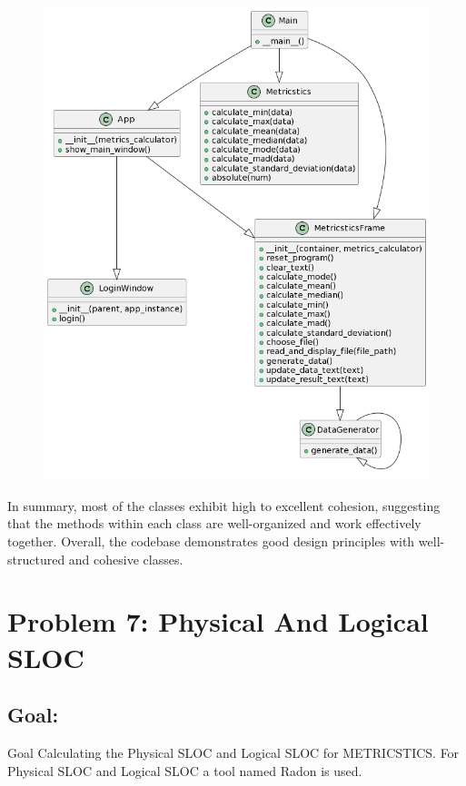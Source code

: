 {{{\begin{figure}[htp]
    \centering
    \includegraphics[width=16cm]{overalldepen.png}
\end{figure}

In summary, most of the classes exhibit high to excellent cohesion, suggesting that the methods within each class are well-organized and work effectively together. Overall, the codebase demonstrates good design principles with well-structured and cohesive classes. }

\pagebreak

\section{Problem 7: Physical And Logical SLOC }

\subsection{Goal: }
\normalsize{Goal Calculating the Physical SLOC and Logical SLOC for METRICSTICS. For Physical SLOC  and Logical SLOC a tool named Radon is used.}

}}
